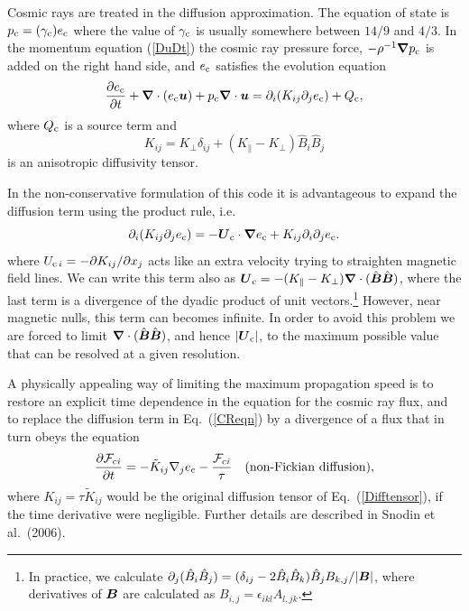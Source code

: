 \documentclass[\mydriver,12pt,twoside,notitlepage,a4paper]{article}
\renewcommand{\vec}[1]{\mbox{\boldmath{$#1$}}}
\newcommand{\Bv}            {\vec{B}}
\newcommand{\Uv}            {\vec{U}}
\newcommand{\uv}            {\vec{u}}
\newcommand{\Eq}[1]{Eq.~(\ref{#1})}
\newcommand{\nab}{\mbox{\boldmath $\nabla$} {}}
\newcommand{\Bhat}{\hat{B}}
\newcommand{\BBhat}{\hat{\vec{B}}}
\begin{document}
Cosmic rays are treated in the diffusion approximation.
The equation of state is $p_{\rm c}=(\gamma_{\rm c})e_{\rm c}$
where the value of $\gamma_{\rm c}$ is usually somewhere between
$14/9$ and $4/3$.
In the momentum equation (\ref{DuDt}) the cosmic ray pressure force,
$-\rho^{-1}\nab p_{\rm c}$ is added on the right hand side, and
$e_{\rm c}$ satisfies the evolution equation
\begin{equation}
{\partial e_{\rm c}\over\partial t}+\nab\cdot(e_{\rm c}\uv)
+p_{\rm c}\nab\cdot\uv=\partial_i(K_{ij}\partial_j e_{\rm c})+Q_{\rm c},
\label{CReqn}
\end{equation}
where $Q_{\rm c}$ is a source term and
\begin{equation}
K_{ij}=K_\perp\delta_{ij}+(K_\parallel-K_\perp)\Bhat_i\Bhat_j
\label{Difftensor}
\end{equation}
is an anisotropic diffusivity tensor.

In the non-conservative formulation of this code it is advantageous
to expand the diffusion term using the product rule, i.e.\
\begin{equation}
\partial_i(K_{ij}\partial_j e_{\rm c})
=-\Uv_{\rm c}\cdot\nab e_{\rm c}+K_{ij}\partial_i\partial_j e_{\rm c}.
\end{equation}
where $U_{{\rm c}\,i}=-\partial K_{ij}/\partial x_j$ acts like an extra
velocity trying to straighten magnetic field lines.
We can write this term also as
$\Uv_{\rm c}=-(K_\parallel-K_\perp)\nab\cdot(\BBhat\BBhat)$,
where the last term is a divergence of the dyadic product of unit
vectors.\footnote{In practice, we calculate $\partial_j(\Bhat_i\Bhat_j)
=(\delta_{ij}-2\Bhat_i\Bhat_k)\Bhat_j B_{k,j}/|\Bv|$, where
derivatives of $\Bv$ are calculated as $B_{i,j}=\epsilon_{ikl}A_{l,jk}$.}
However, near magnetic nulls, this term can becomes infinite.
In order to avoid this problem we are forced to limit
$\nab\cdot(\BBhat\BBhat)$, and hence $|\Uv_{\rm c}|$,
to the maximum possible value that can be resolved at a given
resolution.

A physically appealing way of limiting the maximum propagation
speed is to restore an explicit time dependence in the equation for the
cosmic ray flux, and to replace the diffusion term in \Eq{CReqn} by
a divergence of a flux that in turn obeys the equation
\begin{equation}
{\partial{\cal F}_{{\rm c}i}\over\partial t}=-\tilde{K}_{ij}\nabla_je_{\rm c}
-{{\cal F}_{{\rm c}i}\over\tau}
\quad\mbox{(non-Fickian diffusion)},
\label{nonFickian}
\end{equation}
where $K_{ij}=\tau\tilde{K}_{ij}$ would be the original diffusion tensor
of \Eq{Difftensor}, if the time derivative were negligible.
Further details are described in Snodin et al.\ (2006).
\end{document}
